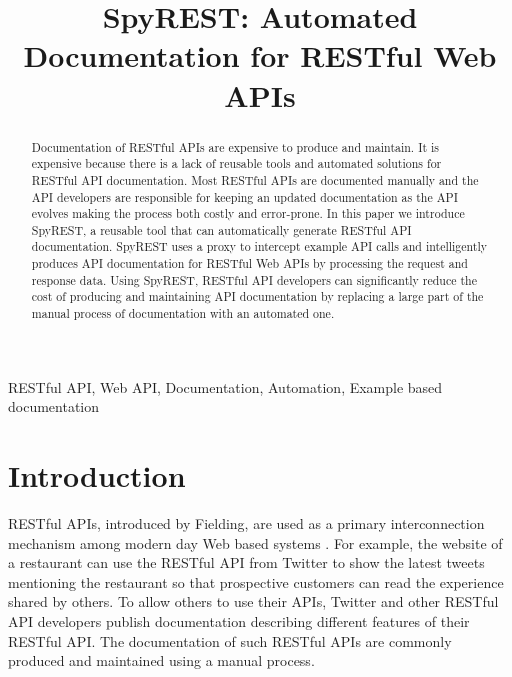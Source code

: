 \documentclass[conference]{IEEEtran}
\begin{document}
\title{SpyREST: Automated Documentation for RESTful Web APIs}


\author{
}
\maketitle


\begin{abstract}
Documentation of RESTful APIs are expensive to produce and maintain. It is expensive because there is a lack of reusable tools and automated solutions for RESTful API documentation. Most RESTful APIs are documented manually and the API developers are responsible for keeping an updated documentation as the API evolves making the process both costly and error-prone. In this paper we introduce SpyREST, a reusable tool that can automatically generate RESTful API documentation. SpyREST uses a proxy to intercept example API calls and intelligently produces API documentation for RESTful Web APIs by processing the request and response data. Using SpyREST, RESTful API developers can significantly reduce the cost of producing and maintaining API documentation by replacing a large part of the manual process of documentation with an automated one.
\end{abstract}

\IEEEpeerreviewmaketitle

\begin{IEEEkeywords}
RESTful API, Web API, Documentation, Automation, Example based documentation
\end{IEEEkeywords}


\section{Introduction}
RESTful APIs, introduced by Fielding, are used as a primary interconnection mechanism among modern day Web based systems \cite{Fielding_rest}. For example, the website of a restaurant can use the RESTful API from Twitter to show the latest tweets mentioning the restaurant so that prospective customers can read the experience shared by others. To allow others to use their APIs, Twitter and other RESTful API developers publish documentation describing different features of their RESTful API. The documentation of such RESTful APIs are commonly produced and maintained using a manual process.
\end{document}
